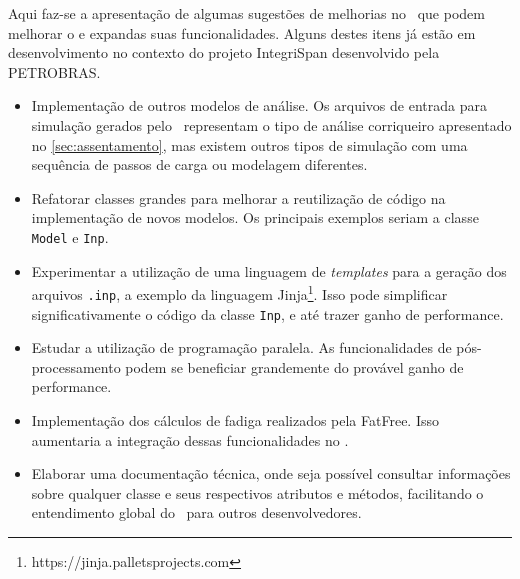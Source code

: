 Aqui faz-se a apresentação de algumas sugestões de melhorias no \frame\ que podem melhorar o e expandas suas funcionalidades. Alguns destes itens já estão em desenvolvimento no contexto do projeto IntegriSpan desenvolvido pela PETROBRAS.

\begin{itemize}
    \item Implementação de outros modelos de análise. Os arquivos de entrada para simulação gerados pelo \frame\ representam o tipo de análise corriqueiro apresentado no \autoref{sec:assentamento}, mas existem outros tipos de simulação com uma sequência de passos de carga ou modelagem diferentes.
    \item Refatorar classes grandes para melhorar a reutilização de código na implementação de novos modelos. Os principais exemplos seriam a classe \texttt{Model} e \texttt{Inp}.
    \item Experimentar a utilização de uma linguagem de \textit{templates} para a geração dos arquivos \texttt{.inp}, a exemplo da linguagem Jinja\footnote{https://jinja.palletsprojects.com}. Isso pode simplificar significativamente o código da classe \texttt{Inp}, e até trazer ganho de performance.
    \item Estudar a utilização de programação paralela. As funcionalidades de pós-processamento podem se beneficiar grandemente do provável ganho de performance.
    \item Implementação dos cálculos de fadiga realizados pela FatFree. Isso aumentaria a integração dessas funcionalidades no \frame.
    \item Elaborar uma documentação técnica, onde seja possível consultar informações sobre qualquer classe e seus respectivos atributos e métodos, facilitando o entendimento global do \frame\ para outros desenvolvedores.
\end{itemize}